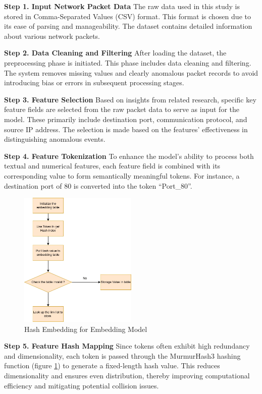 \begin{ZhChapter}
\textbf{Step 1. Input Network Packet Data}
The raw data used in this study is stored in Comma-Separated Values (CSV) format. This format is chosen due to its ease of parsing and manageability. The dataset contains detailed information about various network packets.

\textbf{Step 2. Data Cleaning and Filtering}
After loading the dataset, the preprocessing phase is initiated. This phase includes data cleaning and filtering. The system removes missing values and clearly anomalous packet records to avoid introducing bias or errors in subsequent processing stages.

\textbf{Step 3. Feature Selection}
Based on insights from related research, specific key feature fields are selected from the raw packet data to serve as input for the model. These primarily include destination port, communication protocol, and source IP address. The selection is made based on the features’ effectiveness in distinguishing anomalous events.

\textbf{Step 4. Feature Tokenization}
To enhance the model’s ability to process both textual and numerical features, each feature field is combined with its corresponding value to form semantically meaningful tokens. For instance, a destination port of 80 is converted into the token “Port\_80”.


\begin{figure}[htbp]
    \centering
    \includegraphics[width = 0.5\textwidth]{image/hashembedding.jpg}
    \caption{Hash Embedding for Embedding Model}
    \label{fig: HashEmbedding}
\end{figure}

\textbf{Step 5. Feature Hash Mapping}
Since tokens often exhibit high redundancy and dimensionality, each token is passed through the MurmurHash3 hashing function (figure \ref{fig: HashEmbedding}) to generate a fixed-length hash value. This reduces dimensionality and ensures even distribution, thereby improving computational efficiency and mitigating potential collision issues.


\end{ZhChapter}
